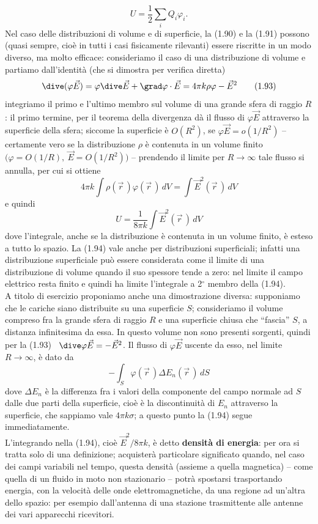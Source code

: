 \begin{equation}
U=\frac12\sum_iQ_i\varphi_i.
\tag{1.92}
\end{equation}
Nel caso delle distribuzioni di volume e di superficie, la (1.90) e la (1.91) possono (quasi sempre, cioè in tutti i casi fisicamente rilevanti) essere riscritte in un modo diverso, ma molto efficace: consideriamo il caso di una distribuzione di volume e partiamo dall'identità (che si dimostra per verifica diretta)
\begin{equation}
\dive(\varphi\vec E)=\varphi\dive\vec E+\grad\varphi\cdot\vec E=4\pi k\rho\varphi-\vec E^2
\tag{1.93}
\end{equation}
integriamo il primo e l'ultimo membro sul volume di una grande sfera di raggio $R$: il primo termine, per il teorema della divergenza dà il flusso di $\varphi\vec E$ attraverso la superficie della sfera; siccome la superficie è $O(R^2)$, se $\varphi\vec E=o(1/R^2)$ -- certamente vero se la distribuzione $\rho$ è contenuta in un volume finito $\big(\varphi=O(1/R),\ \vec E=O(1/R^2)\big)$ -- prendendo il limite per $R\to\infty$ tale flusso si annulla, per cui si ottiene
\[
4\pi k\int\rho(\vec r\,)\varphi(\vec r\,)\,dV=\int\vec E^2(\vec r\,)\,dV
\]
e quindi
\begin{equation}
U=\frac{1}{8\pi k}\int\vec E^2(\vec r\,)\,dV
\tag{1.94}
\end{equation}
dove l'integrale, anche se la distribuzione è contenuta in un volume finito, è esteso a tutto lo spazio. La (1.94) vale anche per distribuzioni superficiali; infatti una distribuzione superficiale può essere considerata come il limite di una distribuzione di volume quando il suo spessore tende a zero: nel limite il campo elettrico resta finito e quindi ha limite l'integrale a 2$^\circ$ membro della (1.94).\\
A titolo di esercizio proponiamo anche una dimostrazione diversa: supponiamo che le cariche siano distribuite su una superficie $S$; consideriamo il volume compreso fra la grande sfera di raggio $R$ e una superficie chiusa che ``fascia'' $S$, a distanza infinitesima da essa. In questo volume non sono presenti sorgenti, quindi per la (1.93) \ $\dive\varphi\vec E=-\vec E^2$. Il flusso di $\varphi\vec E$ uscente da esso, nel limite $R\to\infty$, è dato da
\[
-\int_S\varphi(\vec r\,)\Delta E_n(\vec r\,)\,dS
\]
dove $\Delta E_n$ è la differenza fra i valori della componente del campo normale ad $S$ dalle due parti della superficie, cioè è la discontinuità di $E_n$ attraverso la superficie, che sappiamo vale $4\pi k\sigma$; a questo punto la (1.94) segue immediatamente.\\
L'integrando nella (1.94), cioè $\vec E^2/8\pi k$, è detto \textbf{densità di energia}: per ora si tratta solo di una definizione; acquisterà particolare significato quando, nel caso dei campi variabili nel tempo, questa densità (assieme a quella magnetica) -- come quella di un fluido in moto non stazionario -- potrà spostarsi trasportando energia, con la velocità delle onde elettromagnetiche, da una regione ad un'altra dello spazio: per esempio dall'antenna di una stazione trasmittente alle antenne dei vari apparecchi ricevitori.

